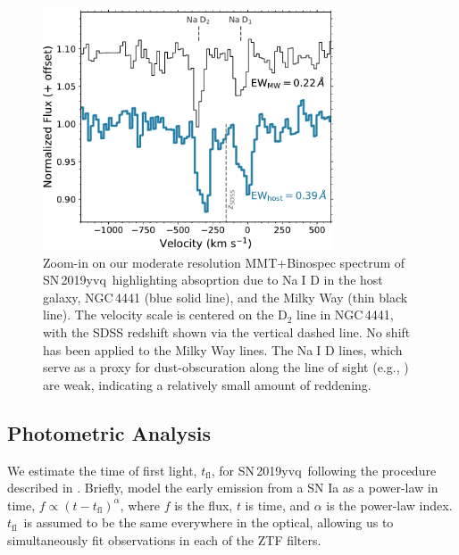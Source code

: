 \documentclass[twocolumn]{aastex63}
\def\ion#1#2{#1$\;${\footnotesize\rm{#2}}\relax}
\newcommand{\tfl}{$t_\mathrm{fl}$}
\newcommand{\sn}{SN\,2019yvq}
\begin{document}
\begin{figure}
    \centering
    \includegraphics[width=3.4in]{./figures/NaD.pdf}
    \caption{Zoom-in on our moderate resolution MMT+Binospec spectrum of \sn\
    highlighting absoprtion due to \ion{Na}{I} D in the host galaxy,
    NGC\,4441 (blue solid line), and the Milky Way (thin black line). The
    velocity scale is centered on the D$_2$ line in NGC\,4441, with the SDSS
    redshift shown via the vertical dashed line. No shift has been applied to
    the Milky Way lines. The \ion{Na}{I} D lines, which serve as a proxy for
    dust-obscuration along the line of sight (e.g.,
    \citep{Poznanski12,Phillips13}) are weak, indicating a relatively small
    amount of reddening. }
    \label{fig:NaD}
\end{figure}

\subsection{Photometric Analysis}

We estimate the time of first light, \tfl, for \sn\ following the procedure
described in \citet{Miller20}. Briefly, \citet{Miller20} model the early
emission from a SN Ia as a power-law in time, $f \propto (t -
t_\mathrm{fl})^\alpha$, where $f$ is the flux, $t$ is time, and $\alpha$ is
the power-law index. \tfl\ is assumed to be the same everywhere in the
optical, allowing us to simultaneously fit observations in each of the ZTF
filters.
\end{document}
